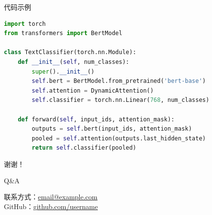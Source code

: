 \documentclass[aspectratio=169]{beamer}
\begin{document}
\begin{frame}{代码示例}
  \begin{lstlisting}[language=Python]
import torch
from transformers import BertModel

class TextClassifier(torch.nn.Module):
    def __init__(self, num_classes):
        super().__init__()
        self.bert = BertModel.from_pretrained('bert-base')
        self.attention = DynamicAttention()
        self.classifier = torch.nn.Linear(768, num_classes)

    def forward(self, input_ids, attention_mask):
        outputs = self.bert(input_ids, attention_mask)
        pooled = self.attention(outputs.last_hidden_state)
        return self.classifier(pooled)
  \end{lstlisting}
\end{frame}

\begin{frame}
  \centering
  \Huge 谢谢！

  \vspace{2em}
  \Large Q\&A

  \vspace{2em}
  \normalsize
  联系方式：\href{mailto:email@example.com}{email@example.com} \\
  GitHub：\href{https://github.com/username}{github.com/username}
\end{frame}
\end{document}
